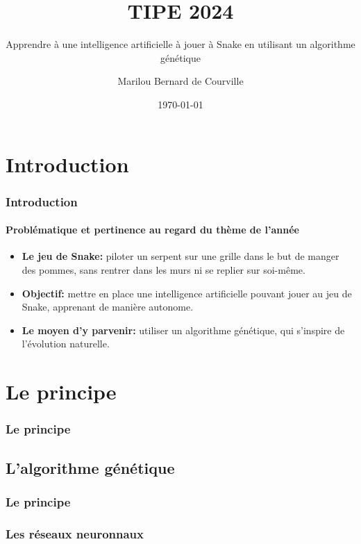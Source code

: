 \documentclass[10pt]{beamer}
\title{TIPE 2024}
\subtitle{Apprendre à une intelligence artificielle à jouer à Snake en utilisant un algorithme génétique}
\author{Marilou Bernard de Courville}
\institute{Lycée Charlemagne}
\date{\today}
\begin{document}
 
\begin{frame}
    \titlepage
\end{frame}


\section{Introduction}

\begin{frame}
\frametitle{Introduction}
\framesubtitle{Problématique et pertinence au regard du thème de l'année}

\begin{itemize}

\item \textbf{Le jeu de Snake:} piloter un serpent sur une grille dans le but de
manger des pommes, sans rentrer dans les murs ni se replier sur 
soi-même.

\item \textbf{Objectif:} mettre en place une intelligence
artificielle pouvant jouer au jeu de Snake, apprenant de manière autonome.

\item \textbf{Le moyen d'y parvenir:} utiliser un algorithme génétique,
qui s'inspire de l'évolution naturelle.

\end{itemize}

\end{frame}

\section{Le principe}

\begin{frame}
\frametitle{Le principe}
\end{frame}

\subsection{L'algorithme génétique}

\begin{frame}
  \frametitle{Le principe}
  \end{frame}

\subsubsection{Les réseaux neuronnaux}
\end{document}
